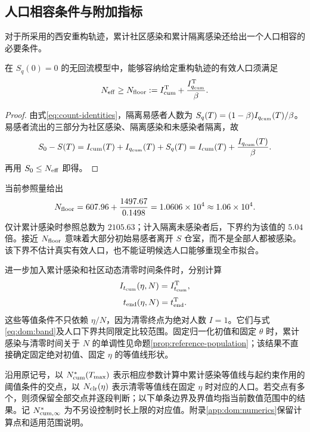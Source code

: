 \documentclass[lang=cn,a4paper,newtx]{elegantpaper}
\numberwithin{equation}{section}
\theoremstyle{plain}
\newcommand{\Itcum}{I_{t_{\mathrm{cum}}}}
\begin{document}
\subsection{人口相容条件与附加指标}
\label{sec:dom:region}
对于所采用的西安重构轨迹，累计社区感染和累计隔离感染还给出一个人口相容的必要条件。
\begin{proposition}
\label{prop:dom:floor}
在 $S_q(0)=0$ 的无回流模型中，能够容纳给定重构轨迹的有效人口须满足
\begin{equation}
N_{\rm eff}\ge N_{\rm floor}:=
 I_{\rm cum}^{\rm T}+\frac{I_{q_{\rm cum}}^{\rm T}}{\beta}.
\label{eq:dom:Nfloor}
\end{equation}
\end{proposition}
\begin{proof}
由式\eqref{eq:count-identities}，隔离易感者人数为
$S_q(T)=(1-\beta)I_{q_{\rm cum}}(T)/\beta$。易感者流出的三部分为社区感染、隔离感染和未感染者隔离，故
\[
S_0-S(T)=I_{\rm cum}(T)+I_{q_{\rm cum}}(T)+S_q(T)
=I_{\rm cum}(T)+\frac{I_{q_{\rm cum}}(T)}\beta.
\]
再用 $S_0\le N_{\rm eff}$ 即得。
\end{proof}
当前参照量给出
\[
N_{\rm floor}=607.96+\frac{1497.67}{0.1498}
=1.0606\times10^4\approx1.06\times10^4.
\]
仅计累计感染时参照总数为 $2105.63$；计入隔离未感染者后，下界约为该值的 $5.04$ 倍。接近 $N_{\rm floor}$ 意味着大部分初始易感者离开 $S$ 仓室，而不是全部人都被感染。该下界不估计真实有效人口，也不能证明候选人口能够重现全市拟合。

\label{sec:dom:extra}
进一步加入累计感染和社区动态清零时间条件时，分别计算
\begin{equation}
\Itcum(\eta,N)=\Itcum^{\rm T},
\label{eq:dom:cumarc}
\end{equation}
\begin{equation}
t_{\rm end}(\eta,N)=t_{\rm end}^{\rm T}.
\label{eq:dom:clrarc}
\end{equation}
这些等值条件不只依赖 $\eta/N$，因为清零终点为绝对人数 $I=1$。它们与式\eqref{eq:dom:band}及人口下界共同限定比较范围。固定归一化初值和固定 $\theta$ 时，累计感染与清零时间关于 $N$ 的单调性见命题\ref{prop:reference-population}；该结果不直接确定固定绝对初值、固定 $\eta$ 的等值线形状。

沿用原记号，以 $N^*_{\rm cum}(T_{\max})$ 表示相应参数计算中累计感染等值线与起约束作用的阈值条件的交点，以 $N_{\rm clr}(\eta)$ 表示清零等值线在固定 $\eta$ 时对应的人口。若交点有多个，则须保留全部交点并逐段判断；以下单条边界及界值均指当前数值范围中的结果。记 $N^*_{\rm cum,\infty}$ 为不另设控制时长上限的对应值。附录\ref{app:dom:numerics}保留计算点和适用范围说明。
\end{document}
